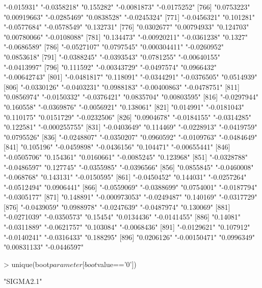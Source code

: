 \begin{Schunk}
\begin{Soutput}
[761] "-0.015931"    "-0.0358218"   "0.155282"     "-0.0081873"   "-0.0175252"  
[766] "0.0753223"    "0.00919663"   "-0.0285469"   "0.0838528"    "-0.0245324"  
[771] "-0.0456321"   "0.101281"     "-0.0577684"   "-0.0578549"   "0.132731"    
[776] "0.0302677"    "0.00794933"   "0.124703"     "0.00780066"   "-0.0108088"  
[781] "0.134473"     "-0.00920211"  "-0.0361238"   "0.1327"       "-0.0686589"  
[786] "-0.0527107"   "0.0797545"    "0.000304411"  "-0.0260952"   "0.0853618"   
[791] "-0.0388245"   "-0.0393543"   "0.0781255"    "-0.00640155"  "-0.0413997"  
[796] "0.111592"     "-0.00343729"  "-0.0497574"   "0.0966432"    "-0.00642743" 
[801] "-0.0481817"   "0.118091"     "-0.0344291"   "-0.0376505"   "0.0514939"   
[806] "-0.0330126"   "-0.0403231"   "0.0988183"    "-0.00400863"  "-0.0478751"  
[811] "0.0856974"    "-0.0150332"   "-0.0376421"   "0.0835704"    "0.00803595"  
[816] "-0.0297944"   "0.160558"     "-0.0369876"   "-0.0056921"   "0.138061"    
[821] "0.014991"     "-0.0181043"   "0.110175"     "0.0151729"    "-0.0232506"  
[826] "0.0904678"    "-0.0184155"   "-0.0314285"   "0.122581"     "-0.000255755"
[831] "-0.0403649"   "0.114469"     "-0.0228913"   "-0.0419759"   "0.0795526"   
[836] "-0.0248807"   "-0.0350207"   "0.0960592"    "-0.0109763"   "-0.0484649"  
[841] "0.105196"     "-0.0459898"   "-0.0436156"   "0.104471"     "-0.00655441" 
[846] "-0.0505706"   "0.154361"     "0.0160661"    "-0.0085245"   "0.123968"    
[851] "-0.0328788"   "-0.0486597"   "0.127745"     "-0.0355985"   "-0.0396566"  
[856] "0.0855845"    "-0.0460008"   "-0.068768"    "0.143131"     "-0.0150595"  
[861] "-0.0450452"   "0.144031"     "-0.0257264"   "-0.0512494"   "0.0906441"   
[866] "-0.0559069"   "-0.0388699"   "0.0754001"    "-0.0187794"   "-0.0305177"  
[871] "0.148891"     "-0.000973053" "-0.0249487"   "0.140169"     "-0.0317729"  
[876] "-0.0439059"   "0.0988978"    "-0.0247639"   "-0.0487974"   "0.130069"    
[881] "-0.0271039"   "-0.0350573"   "0.15454"      "0.0134436"    "-0.0141455"  
[886] "0.14081"      "-0.0311889"   "-0.0621757"   "0.103084"     "-0.0068436"  
[891] "-0.0129621"   "0.107912"     "-0.0140241"   "-0.0316433"   "0.188295"    
[896] "0.0206126"    "-0.00150471"  "0.0996349"    "0.00831133"   "-0.0446597"  
\end{Soutput}
\begin{Sinput}
> unique(boot$parameter[boot$value=='0'])
\end{Sinput}
\begin{Soutput}
[1] "SIGMA2.1"
\end{Soutput}
\end{Schunk}
